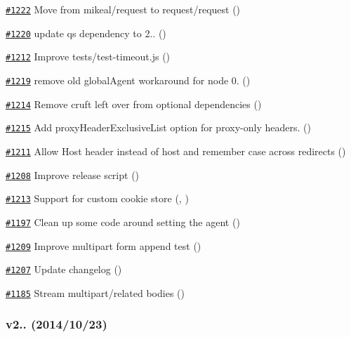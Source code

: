 \begin{DoxyItemize}
\item \href{https://github.com/request/request/pull/1222}{\tt \#1222} Move from mikeal/request to request/request ()
\item \href{https://github.com/request/request/pull/1220}{\tt \#1220} update qs dependency to 2.. ()
\item \href{https://github.com/request/request/pull/1212}{\tt \#1212} Improve tests/test-\/timeout.\+js ()
\item \href{https://github.com/request/request/pull/1219}{\tt \#1219} remove old global\+Agent workaround for node 0. ()
\item \href{https://github.com/request/request/pull/1214}{\tt \#1214} Remove cruft left over from optional dependencies ()
\item \href{https://github.com/request/request/pull/1215}{\tt \#1215} Add proxy\+Header\+Exclusive\+List option for proxy-\/only headers. ()
\item \href{https://github.com/request/request/pull/1211}{\tt \#1211} Allow \textquotesingle{}Host\textquotesingle{} header instead of \textquotesingle{}host\textquotesingle{} and remember case across redirects ()
\item \href{https://github.com/request/request/pull/1208}{\tt \#1208} Improve release script ()
\item \href{https://github.com/request/request/pull/1213}{\tt \#1213} Support for custom cookie store (, )
\item \href{https://github.com/request/request/pull/1197}{\tt \#1197} Clean up some code around setting the agent ()
\item \href{https://github.com/request/request/pull/1209}{\tt \#1209} Improve multipart form append test ()
\item \href{https://github.com/request/request/pull/1207}{\tt \#1207} Update changelog ()
\item \href{https://github.com/request/request/pull/1185}{\tt \#1185} Stream multipart/related bodies ()
\end{DoxyItemize}

\subsubsection*{v2.. (2014/10/23)}



